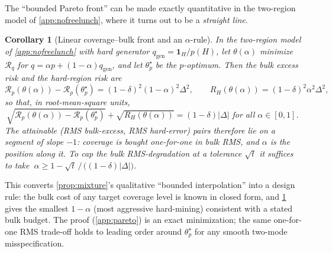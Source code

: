 \documentclass{article}
\theoremstyle{plain}
\newtheorem{corollary}{Corollary}
\theoremstyle{definition}
\theoremstyle{remark}
\newcommand{\pnat}{p}
\newcommand{\qtr}{q}
\newcommand{\qgen}{q_{\mathrm{gen}}}
\newcommand{\Rp}{\mathcal{R}_{\pnat}}
\newcommand{\Rq}{\mathcal{R}_{\qtr}}
\newcommand{\unif}{\alpha}
\begin{document}
The ``bounded Pareto front'' can be made exactly quantitative in the two-region model of
\cref{app:nofreelunch}, where it turns out to be a \emph{straight line}.
\begin{corollary}[Linear coverage--bulk front and an $\unif$-rule]\label{cor:pareto}
In the two-region model of \cref{app:nofreelunch} with hard generator $\qgen=\mathbf 1_H/\pnat(H)$, let
$\theta(\unif)$ minimize $\Rq$ for $\qtr=\unif\pnat+(1-\unif)\qgen$, and let $\theta_\pnat^\star$ be the
$\pnat$-optimum. Then the bulk excess risk and the hard-region risk are
\[
  \Rp(\theta(\unif))-\Rp(\theta_\pnat^\star)=(1-\delta)^2(1-\unif)^2\Delta^2,\qquad
  R_H(\theta(\unif))=(1-\delta)^2\unif^2\Delta^2,
\]
so that, in root-mean-square units,
$\ \sqrt{\Rp(\theta(\unif))-\Rp(\theta_\pnat^\star)}+\sqrt{R_H(\theta(\unif))}=(1-\delta)|\Delta|$ for all
$\unif\in[0,1]$. The attainable (RMS bulk-excess, RMS hard-error) pairs therefore lie on a segment of
slope $-1$: coverage is bought one-for-one in bulk RMS, and $\unif$ is the position along it. To cap the
bulk RMS-degradation at a tolerance $\sqrt{t}$ it suffices to take
$\ \unif\ge 1-\sqrt{t}\,/\,\bigl((1-\delta)|\Delta|\bigr)$.
\end{corollary}
This converts \cref{prop:mixture}'s qualitative ``bounded interpolation'' into a design rule: the bulk
cost of any target coverage level is known in closed form, and \cref{cor:pareto} gives the smallest
$1-\unif$ (most aggressive hard-mining) consistent with a stated bulk budget. The proof
(\cref{app:pareto}) is an exact minimization; the same one-for-one RMS trade-off holds to leading order
around $\theta_\pnat^\star$ for any smooth two-mode misspecification.
\end{document}
